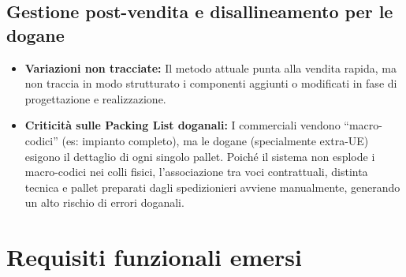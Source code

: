 \subsection{Gestione post-vendita e disallineamento per le dogane}
\begin{itemize}
      \item \textbf{Variazioni non tracciate:} Il metodo attuale punta alla vendita rapida,
            ma non traccia in modo strutturato i componenti aggiunti o modificati in fase di progettazione e realizzazione.
      \item \textbf{Criticità sulle Packing List doganali:} I commerciali vendono ``macro-codici'' (es: impianto completo),
            ma le dogane (specialmente extra-UE) esigono il dettaglio di ogni singolo pallet. Poiché il sistema non
            esplode i macro-codici nei colli fisici, l'associazione tra voci contrattuali, distinta tecnica e pallet preparati
            dagli spedizionieri avviene manualmente, generando un alto rischio di errori doganali.
\end{itemize}

\section{Requisiti funzionali emersi}

